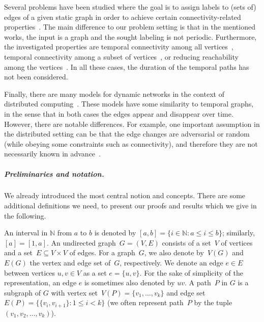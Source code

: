 \documentclass[a4paper,UKenglish,cleveref, autoref, thm-restate, anonymous]{lipics-v2021}
\begin{document}
Several problems have been studied where the goal is to assign labels to (sets of) edges of a given static graph in order to achieve certain connectivity-related properties~\cite{KlobasMMS22,MertziosMS19,akrida2017complexity,enright2021assigning}. The main difference to our problem setting is that in the mentioned works, the input is a graph and the sought labeling is not periodic. Furthermore, the investigated properties are temporal connectivity among all vertices~\cite{KlobasMMS22,MertziosMS19,akrida2017complexity}, temporal connectivity among a subset of vertices~\cite{KlobasMMS22}, or reducing reachability among the vertices~\cite{enright2021assigning}. In all these cases, the duration of the temporal paths has not been considered.




Finally, there are many models for dynamic networks in the context of distributed computing~\cite{Kuhn2011Dynamic}. 
These models have some similarity to temporal graphs, in the sense that in both cases the edges appear and disappear over time. 
However, there are notable differences. For example, one important assumption in the distributed setting 
can be that the edge changes are adversarial or random (while obeying some constraints such as connectivity), 
and therefore they are not necessarily known in advance~\cite{Kuhn2011Dynamic}. 




\subparagraph{Preliminaries and notation.}
We already introduced the most central notion and concepts. There are some additional definitions we need, to present our proofs and results which we give in the following. 

An interval in $\mathbb N$ from $a$ to $b$ is denoted by $[a,b] = \{ i\in \mathbb N  :  a \leq i \leq b\}$; similarly, $[a] = [1,a]$.
An undirected graph~$G=(V,E)$ consists of a set~$V$ of vertices 
and a set~$E \subseteq V \times V$ of edges.
For a graph~$G$, we also denote by~$V(G)$ and~$E(G)$ the vertex and edge set of~$G$, respectively.
We denote an edge $e \in E$ between vertices $u,v \in V$ as a set $e=\{u,v\}$.
For the sake of simplicity of the representation, an edge $e$ is sometimes also denoted by $uv$. 
A path~$P$ in $G$ is a subgraph of $G$ with vertex set~$V(P)=\{v_1,\dots,v_k\}$ and edge set~$E(P)=\{\{v_i,v_{i+1}\} :  1\leq i<k\}$
(we often represent path~$P$ by the tuple~$(v_1,v_2,\dots,v_k)$).
\end{document}
